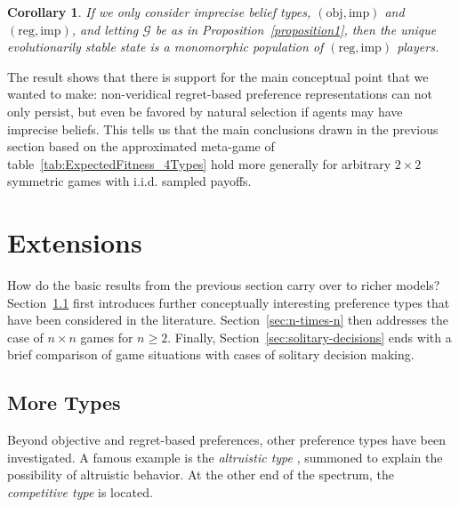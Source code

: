 \documentclass[fleqn,reqno,12pt]{article}
\theoremstyle{Satz}
\newtheorem{corollary}{Corollary}
\theoremstyle{Bsp}
\begin{document}
\begin{corollary} \label{corollary1} If we only consider imprecise belief types, $(\text{obj}, \text{imp})$ and
  $(\text{reg}, \text{imp})$, and letting $\mathcal{G}$ be as in Proposition~\ref{proposition1}, then the unique evolutionarily stable state is a monomorphic population of
  $(\text{reg}, \text{imp})$ players.
\end{corollary}

The result shows that there is support for the main conceptual
point that we wanted to make: 
non-veridical regret-based preference representations can not only persist, but even be favored by
natural selection if agents may have imprecise beliefs.
This
tells us that the main conclusions drawn in the previous section based on the approximated meta-game of table~\ref{tab:ExpectedFitness_4Types} hold more generally 
for
arbitrary $2 \times 2$ symmetric games with i.i.d. sampled payoffs.

\section{Extensions}
\label{sec:extensions}

How do the basic results from the previous section carry over to richer models?
Section~\ref{sec:more-types} first introduces further conceptually interesting preference types
that have been considered in the literature. Section~\ref{sec:n-times-n} then addresses the
case of $n \times n$ games for $n \ge 2$. Finally, Section~\ref{sec:solitary-decisions} ends
with a brief comparison of game situations with cases of solitary decision making.

\subsection{More Types}
\label{sec:more-types}


Beyond objective and regret-based preferences, other preference types have been investigated. A
famous example is the \textit{altruistic type} \citep[e.g.,][]{Beck76,BestGuth98}, summoned to
explain the possibility of altruistic behavior. At the other end of the spectrum, the \emph{competitive
type} is located. 
\end{document}
